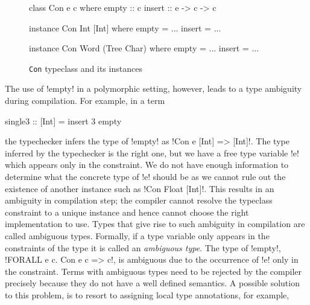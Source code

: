 \documentclass[screen,nonacm,manuscript,review]{acmart} %
\begin{document}
\begin{figure}[ht]
\centering
\begin{minipage}[ht]{0.3\linewidth}
\begin{CenteredBox}
\begin{code}
class Con e c
where
  empty :: c
  insert :: e -> c -> c
\end{code}
\end{CenteredBox}
\end{minipage}%
\begin{minipage}[ht]{0.3\linewidth}
\begin{CenteredBox}
\begin{code}
instance Con Int [Int]
where
  empty = ...
  insert = ...
\end{code}
\end{CenteredBox}
\end{minipage}%
\begin{minipage}[ht]{0.3\linewidth}
\begin{CenteredBox}
\begin{code}
instance Con Word (Tree Char)
where
  empty = ...
  insert = ...
\end{code}
\end{CenteredBox}
\end{minipage}
\caption[\lstinline{Con} typeclass]{\lstinline{Con} typeclass and its instances}
\label{fig:tc-collection}
\end{figure}

The use of !empty! in a polymorphic setting, however, leads to a type ambiguity during
compilation. For example, in a term

\begin{CenteredBox}
\begin{code}
single3 :: [Int] = insert 3 empty
\end{code}
\end{CenteredBox}

the typechecker infers the type of !empty! as !Con e [Int] => [Int]!. The type inferred by
the typechecker is the right one, but we have a free type variable
!e! which appears only in the constraint. We do not have enough
information to determine what the concrete type of !e! should be as
we cannot rule out the existence of another instance such as !Con Float [Int]!.
This results in an ambiguity in compilation step; the compiler cannot
resolve the typeclass constraint to a unique instance and hence cannot
choose the right implementation to use. Types that
give rise to such ambiguity in compilation are called ambiguous types. Formally, if a
type variable only appears in the constraints of the type it is called
an \emph{ambiguous type}. The type of !empty!,
!FORALL e c. Con e c => c!, is ambiguous due to the occurrence of !e! only in the
constraint. Terms with ambiguous types need to be rejected by the compiler
precisely because they do not have a well defined semantics.
A possible solution to this problem, is to resort to assigning local
type annotations, for example,
\end{document}
